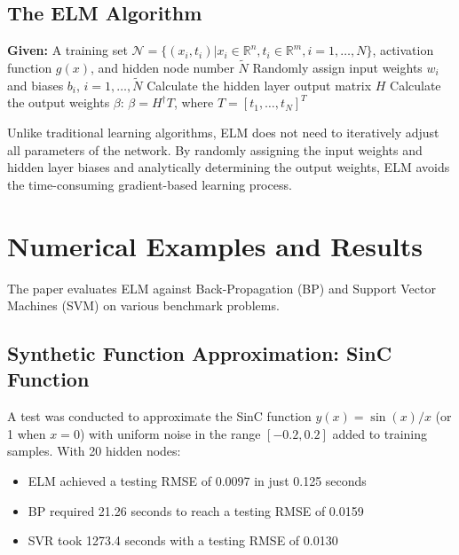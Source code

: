 \documentclass[11pt]{article}
\begin{document}
\subsection{The ELM Algorithm}

\begin{algorithm}
\caption{Extreme Learning Machine (ELM)}
\begin{algorithmic}[1]
\State \textbf{Given:} A training set $\mathcal{N} = \{(x_i, t_i) | x_i \in \mathbb{R}^n, t_i \in \mathbb{R}^m, i = 1, \ldots, N\}$, activation function $g(x)$, and hidden node number $\tilde{N}$
\State Randomly assign input weights $w_i$ and biases $b_i$, $i = 1, \ldots, \tilde{N}$
\State Calculate the hidden layer output matrix $H$ 
\State Calculate the output weights $\beta$: $\beta = H^{\dagger}T$, where $T = [t_1, \ldots, t_N]^T$
\end{algorithmic}
\end{algorithm}

Unlike traditional learning algorithms, ELM does not need to iteratively adjust all parameters of the network. By randomly assigning the input weights and hidden layer biases and analytically determining the output weights, ELM avoids the time-consuming gradient-based learning process.

\section{Numerical Examples and Results}

The paper evaluates ELM against Back-Propagation (BP) and Support Vector Machines (SVM) on various benchmark problems.

\subsection{Synthetic Function Approximation: SinC Function}

A test was conducted to approximate the SinC function $y(x) = \sin(x)/x$ (or 1 when $x = 0$) with uniform noise in the range $[-0.2, 0.2]$ added to training samples. With 20 hidden nodes:
\begin{itemize}
    \item ELM achieved a testing RMSE of 0.0097 in just 0.125 seconds
    \item BP required 21.26 seconds to reach a testing RMSE of 0.0159
    \item SVR took 1273.4 seconds with a testing RMSE of 0.0130
\end{itemize}
\end{document}
